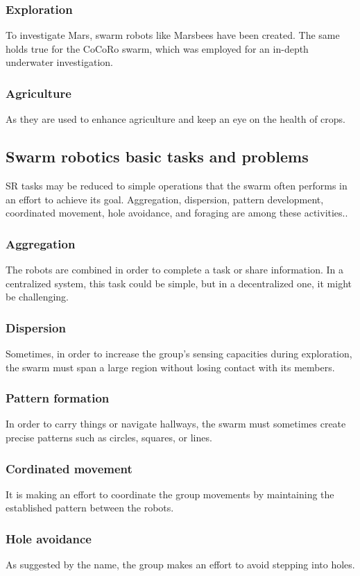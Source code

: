\documentclass[12pt]{extarticle}
\begin{document}
\subsubsection{Exploration}
To investigate Mars, swarm robots like Marsbees have been created. The same holds true for the CoCoRo swarm, which was employed for an in-depth underwater investigation.
\subsubsection{Agriculture}
As they are  used to enhance agriculture and keep an eye on the health of crops. 

\subsection{Swarm robotics basic tasks and problems}
SR tasks may be reduced to simple operations that the swarm often performs in an effort to achieve its goal.
Aggregation, dispersion, pattern development, coordinated movement, hole avoidance, and foraging are among these activities.\cite{bayindir2007review}\cite{navarro2013introduction}.

\subsubsection{Aggregation}
The robots are combined in order to complete a task or share information. In a centralized system, this task could be simple, but in a decentralized one, it might be challenging.
\subsubsection{Dispersion}
Sometimes, in order to increase the group's sensing capacities during exploration, the swarm must span a large region without losing contact with its members. 
\subsubsection{Pattern formation}
In order to carry things or navigate hallways, the swarm must sometimes create precise patterns such as circles, squares, or lines.
\subsubsection{Cordinated movement}
It is making an effort to coordinate the group movements by maintaining the established pattern between the robots.
\subsubsection{Hole avoidance}
As suggested by the name, the group makes an effort to avoid stepping into holes.
\end{document}
